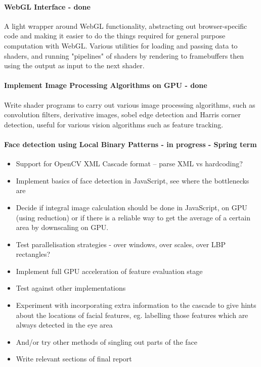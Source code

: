 \documentclass[a4paper]{article}
\begin{document}
\paragraph{WebGL Interface - done}
A light wrapper around WebGL functionality, abstracting out browser-specific code and making it easier to do the things required for general purpose computation with WebGL. Various utilities for loading and passing data to shaders, and running "pipelines" of shaders by rendering to framebuffers then using the output as input to the next shader.

\paragraph{Implement Image Processing Algorithms on GPU - done}
Write shader programs to carry out various image processing algorithms, such as convolution filters, derivative images, sobel edge detection and Harris corner detection, useful for various vision algorithms such as feature tracking.

\paragraph{Face detection using Local Binary Patterns - in progress - Spring term}
\begin{itemize}
\item Support for OpenCV XML Cascade format -- parse XML vs hardcoding?
\item Implement basics of face detection in JavaScript, see where the bottlenecks are
\item Decide if integral image calculation should be done in JavaScript, on GPU (using reduction) or if there is a reliable way to get the average of a certain area by downscaling on GPU.
\item Test parallelisation strategies - over windows, over scales, over LBP rectangles?
\item Implement full GPU acceleration of feature evaluation stage
\item Test against other implementations
\item Experiment with incorporating extra information to the cascade to give hints about the locations of facial features, eg. labelling those features which are always detected in the eye area
\item And/or try other methods of singling out parts of the face
\item Write relevant sections of final report
\end{itemize}
\end{document}

